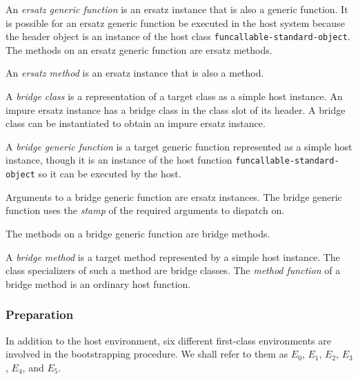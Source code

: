 \begin{definition}
An \emph{ersatz generic function} is an ersatz instance that is also a
generic function.  It is possible for an ersatz generic function be
executed in the host system because the header object is an instance
of the host class \texttt{funcallable-standard-object}.  The methods
on an ersatz generic function are ersatz methods.
\end{definition}

\begin{definition}
An \emph{ersatz method} is an ersatz instance that is also a method.
\end{definition}

\begin{definition}
A \emph{bridge class} is a representation of a target class as a
simple host instance.  An impure ersatz instance has a bridge class in
the class slot of its header.  A bridge class can be instantiated to
obtain an impure ersatz instance.
\end{definition}

\begin{definition}
A \emph{bridge generic function} is a target generic function
represented as a simple host instance, though it is an instance of the
host function \texttt{funcallable-standard-object} so it can be
executed by the host.

Arguments to a bridge generic function are ersatz instances.  The
bridge generic function uses the 
\emph{stamp}
 of
the required arguments to dispatch on. 

The methods on a bridge generic function are bridge methods.
\end{definition}

\begin{definition}
A \emph{bridge method} is a target method represented by a simple host
instance.  The class specializers of such a method are bridge classes.
The \emph{method function} of a bridge method is an ordinary host
function.
\end{definition}

\subsubsection{Preparation}

In addition to the host environment, six different \sysname{}
first-class environments are involved in the bootstrapping procedure.
We shall refer to them as $E_0$, $E_1$, $E_2$, $E_3$, $E_4$, and $E_5$.

